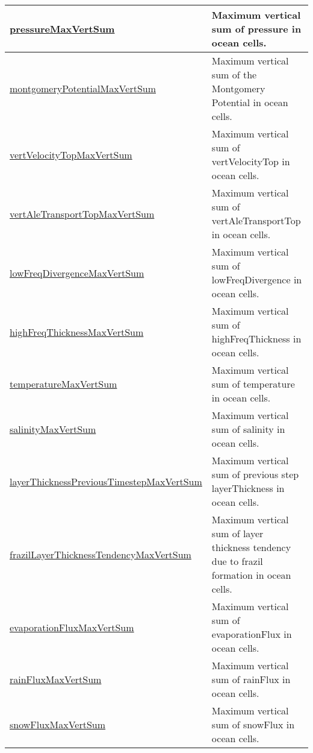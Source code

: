{\begin{center}
\begin{longtable}{| p{2.0in} | p{4.0in} |}
    \hline
    \hyperref[subsec:var_sec_globalStatsAM_pressureMaxVertSum]{pressureMaxVertSum} & Maximum vertical sum of pressure in ocean cells. \\
    \hline
    \hyperref[subsec:var_sec_globalStatsAM_montgomeryPotentialMaxVertSum]{montgomeryPotentialMaxVert\-Sum} & Maximum vertical sum of the Montgomery Potential in ocean cells. \\
    \hline
    \hyperref[subsec:var_sec_globalStatsAM_vertVelocityTopMaxVertSum]{vertVelocityTopMaxVertSum} & Maximum vertical sum of vertVelocityTop in ocean cells. \\
    \hline
    \hyperref[subsec:var_sec_globalStatsAM_vertAleTransportTopMaxVertSum]{vertAleTransportTopMaxVert\-Sum} & Maximum vertical sum of vertAleTransportTop in ocean cells. \\
    \hline
    \hyperref[subsec:var_sec_globalStatsAM_lowFreqDivergenceMaxVertSum]{lowFreqDivergenceMaxVertSum} & Maximum vertical sum of lowFreqDivergence in ocean cells. \\
    \hline
    \hyperref[subsec:var_sec_globalStatsAM_highFreqThicknessMaxVertSum]{highFreqThicknessMaxVertSum} & Maximum vertical sum of highFreqThickness in ocean cells. \\
    \hline
    \hyperref[subsec:var_sec_globalStatsAM_temperatureMaxVertSum]{temperatureMaxVertSum} & Maximum vertical sum of temperature in ocean cells. \\
    \hline
    \hyperref[subsec:var_sec_globalStatsAM_salinityMaxVertSum]{salinityMaxVertSum} & Maximum vertical sum of salinity in ocean cells. \\
    \hline
    \hyperref[subsec:var_sec_globalStatsAM_layerThicknessPreviousTimestepMaxVertSum]{layerThicknessPreviousTimestep\-MaxVertSum} & Maximum vertical sum of previous step layerThickness in ocean cells. \\
    \hline
    \hyperref[subsec:var_sec_globalStatsAM_frazilLayerThicknessTendencyMaxVertSum]{frazilLayerThicknessTendencyMax\-VertSum} & Maximum vertical sum of layer thickness tendency due to frazil formation in ocean cells. \\
    \hline
    \hyperref[subsec:var_sec_globalStatsAM_evaporationFluxMaxVertSum]{evaporationFluxMaxVertSum} & Maximum vertical sum of evaporationFlux in ocean cells. \\
    \hline
    \hyperref[subsec:var_sec_globalStatsAM_rainFluxMaxVertSum]{rainFluxMaxVertSum} & Maximum vertical sum of rainFlux in ocean cells. \\
    \hline
    \hyperref[subsec:var_sec_globalStatsAM_snowFluxMaxVertSum]{snowFluxMaxVertSum} & Maximum vertical sum of snowFlux in ocean cells. \\

\end{longtable}
\end{center}}
